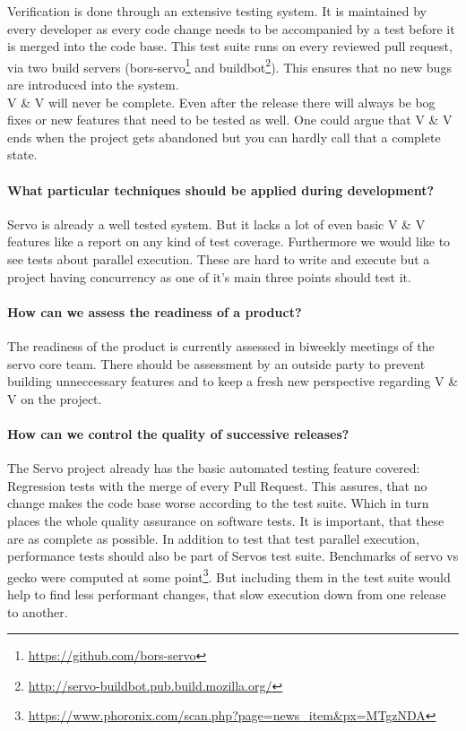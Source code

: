 \documentclass{scrartcl}
\begin{document}
  Verification is done through an extensive testing system. It is maintained by every developer as every code change needs to be accompanied by a test before it is merged into the code base. This test suite runs on every reviewed pull request, via two build servers (bors-servo\footnote{\url{https://github.com/bors-servo}} and buildbot\footnote{\url{http://servo-buildbot.pub.build.mozilla.org/}}). This ensures that no new bugs are introduced into the system.\\
  
V \& V will never be complete. Even after the release there will always be bog fixes or new features that need to be tested as well. One could argue that V \& V ends when the project gets abandoned but you can hardly call that a complete state.

\paragraph{What particular techniques should be applied during development?}
Servo is already a well tested system. But it lacks a lot of even basic V \& V features like a report on any kind of test coverage. Furthermore we would like to see tests about parallel execution. These are hard to write and execute but a project having concurrency as one of it's main three points should test it.

\paragraph{How can we assess the readiness of a product?} 
The readiness of the product is currently assessed in biweekly meetings of the servo core team. There should be assessment by an outside party to prevent building unneccessary features and to keep a fresh new perspective regarding V \& V on the project.

\paragraph{How can we control the quality of successive releases?}
The Servo project already has the basic automated testing feature covered: Regression tests with the merge of every Pull Request. This assures, that no change makes the code base worse according to the test suite. Which in turn places the whole quality assurance on software tests. It is important, that these are as complete as possible. In addition to test that test parallel execution, performance tests should also be part of Servos test suite. Benchmarks of servo vs gecko were computed at some point\footnote{\url{https://www.phoronix.com/scan.php?page=news_item&px=MTgzNDA}}. But including them in the test suite would help to find less performant changes, that slow execution down from one release to another.
\end{document}
